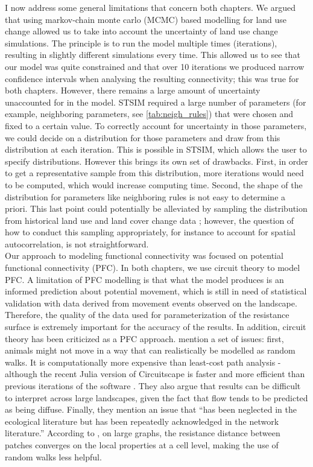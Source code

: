 \documentclass[12pt,Bold,TexShade]{thesis/mcgilletdclass}
\begin{document}
{I now address some general limitations that concern both chapters. We argued that using markov-chain monte carlo (MCMC) based modelling for land use change allowed us to take into account the uncertainty of land use change simulations. The principle is to run the model multiple times (iterations), resulting in slightly different simulations every time. This allowed us to see that our model was quite constrained and that over 10 iterations we produced narrow confidence intervals when analysing the resulting connectivity; this was true for both chapters. However, there remains a large amount of uncertainty unaccounted for in the model. STSIM required a large number of parameters (for example, neighboring parameters, see \ref{tab:neigh_rules}) that were chosen and fixed to a certain value. To correctly account for uncertainty in those parameters, we could decide on a distribution for those parameters and draw from this distribution at each iteration. This is possible in STSIM, which allows the user to specify distributions. However this brings its own set of drawbacks. First, in order to get a representative sample from this distribution, more iterations would need to be computed, which would increase computing time. Second, the shape of the distribution for parameters like neighboring rules is not easy to determine a priori. This last point could potentially be alleviated by sampling the distribution from historical land use and land cover change data ; however, the question of how to conduct this sampling appropriately, for instance to account for spatial autocorrelation, is not straightforward. \\

Our approach to modeling functional connectivity was focused on potential functional connectivity (PFC). In both chapters, we use circuit theory to model PFC. A limitation of PFC modelling is that what the model produces is an informed prediction about potential movement, which is still in need of statistical validation with data derived from movement events observed on the landscape. Therefore, the quality of the data used for parameterization of the resistance surface is extremely important for the accuracy of the results. In addition, circuit theory has been criticized as a PFC approach. \cite{fletcher_spatial_2018} mention a set of issues: first, animals might not move in a way that can realistically be modelled as random walks. It is computationally more expensive than least-cost path analysis - although the recent Julia version of Circuitscape is faster and more efficient than previous iterations of the software \citep{anantharaman_circuitscape_2020}. They also argue that results can be difficult to interpret across large landscapes, given the fact that flow tends to be predicted as being diffuse. Finally, they mention an issue that “has been neglected in the ecological literature but has been repeatedly acknowledged in the network literature.” According to \cite{luxburg_hitting_2014}, on large graphs, the resistance distance  between patches converges on the local properties at a cell level, making the use of random walks less helpful. \\

}
\end{document}
